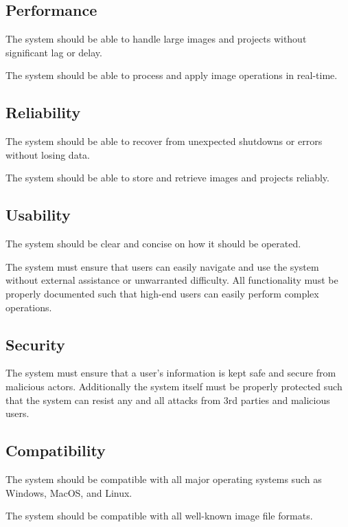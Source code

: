 \documentclass[11pt,a4paper]{article}
\begin{document}
\subsection*{Performance}

The system should be able to handle large images and projects without
significant lag or delay.

The system should be able to process and apply image operations in real-time.

\subsection*{Reliability} 

The system should be able to recover from unexpected shutdowns or errors without
losing data.

The system should be able to store and retrieve images and projects reliably.

\subsection*{Usability} 
The system should be clear and concise on how it should be operated. 

The system must ensure that users can easily navigate and use the system without external assistance or unwarranted difficulty. All functionality must be properly documented such that high-end users can easily perform complex operations.

\subsection*{Security} 

The system must ensure that a user's information is kept safe and secure from malicious actors. Additionally the system itself must be properly protected such that the system can resist any and all attacks from 3rd parties and malicious users. 

\subsection*{Compatibility} 

The system should be compatible with all major operating systems such as
Windows, MacOS, and Linux.

The system should be compatible with all well-known image file formats.
\end{document}
